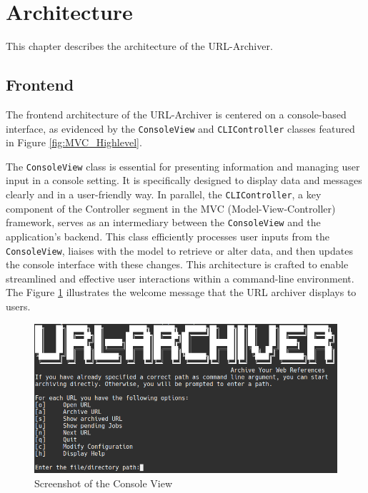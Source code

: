 \section{Architecture}
This chapter describes the architecture of the URL-Archiver. 

\subsection{Frontend}
The frontend architecture of the URL-Archiver is centered on a console-based interface, as evidenced by the \texttt{ConsoleView} and \texttt{CLIController} classes featured in Figure \ref{fig:MVC_Highlevel}.

The \texttt{ConsoleView} class is essential for presenting information and managing user input in a console setting. It is specifically designed to display data and messages clearly and in a user-friendly way. In parallel, the \texttt{CLIController}, a key component of the Controller segment in the MVC (Model-View-Controller)  framework, serves as an intermediary between the \texttt{ConsoleView} and the application’s backend. This class efficiently processes user inputs from the \texttt{ConsoleView}, liaises with the model to retrieve or alter data, and then updates the console interface with these changes. This architecture is crafted to enable streamlined and effective user interactions within a command-line environment. The Figure \ref{fig:Screenshot_ConsoleView} illustrates the welcome message that the URL archiver displays to users. 
\vskip 0.5cm
\begin{figure}[h!]
    \center
    \includegraphics[width=1\textwidth]{pictures/final_presentation/command_line_application.jpg}
    \caption{Screenshot of the Console View}
    \label{fig:Screenshot_ConsoleView}
\end{figure}



